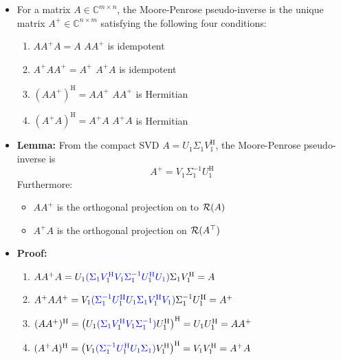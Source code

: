 \documentclass[11pt,twoside]{report}
\newcommand{\bbC}{{\mathbb{C}}}
\newcommand{\Herm}{{\mathrm{H}}}
\begin{document}
\begin{itemize}


\item For a matrix $A \in \bbC^{m\times n}$, the Moore-Penrose pseudo-inverse is the unique matrix $A^+ \in \bbC^{n\times m}$ satisfying the following four conditions: 
\begin{enumerate}
\item $A A^+ A = A$ \hfill  $A A^+$ is idempotent
\item $A^+ A A^+ = A^+$  \hfill $A^+ A$ is idempotent
\item $(A A^+)^\Herm = A A^+$ \hfill   $A A^+$ is Hermitian
\item $(A^+ A)^\Herm = A^+ A$ \hfill $A^+ A$ is Hermitian
\end{enumerate}

\item \textbf{Lemma:} 
From the compact SVD $A = U_1 \Sigma_1 V_1^\Herm$, the Moore-Penrose pseudo-inverse is 
\[
A^+ = V_1
\Sigma_1^{-1} U_1^\Herm
\]
Furthermore:
\begin{itemize}
\item $A A^+$ is the orthogonal projection on to $\mathcal{R}(A)$
\item $A^+ A$ is the orthogonal projection on $\mathcal{R}(A^\top)$
\end{itemize}


\item \textbf{Proof:} 
\begin{enumerate}
\item $A A^+ A = U_1 {\color{blue}(\Sigma_1 V_1^\Herm  V_1
\Sigma_1^{-1} U_1^\Herm  U_1)} \Sigma_1 V_1^\Herm = A $
\item $A^+ A A^+ =  V_1
{\color{blue}(\Sigma_1^{-1} U_1^\Herm U_1 \Sigma_1 V_1^\Herm  V_1)}
\Sigma_1^{-1} U_1^\Herm  = A^+$
\item $(A A^+)^\Herm = \big(U_1 {\color{blue}(\Sigma_1 V_1^\Herm V_1
\Sigma_1^{-1})} U_1^\Herm \big)^\Herm  = {U_1 U_1^\Herm} = A A^+$
\item $(A^+ A)^\Herm = \big(V_1 {\color{blue}(\Sigma_1^{-1} U_1^\Herm U_1
\Sigma_1)} V_1^\Herm \big)^\Herm  = {V_1 V_1^\Herm} = A^+ A$ \qedhere
\end{enumerate}


\end{itemize}



 
\end{document}
